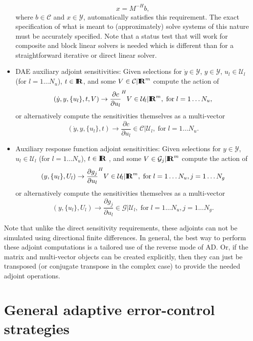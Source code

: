 \documentclass[pdf,ps2pdf,11pt]{SANDreport}
\begin{document}
\begin{itemize}
\[
x = M^{-H} b,
\]
where $b\in\mathcal{C}$ and $x\in\mathcal{Y}$, automatically satisfies this
requirement.  The exact specification of what is meant to (approximately)
solve systems of this nature must be accurately specified. Note that a status
test that will work for composite and block linear solvers is needed which is
different than for a straightforward iterative or direct linear solver.
%
{}\item DAE auxiliary adjoint sensitivities: Given selections for
$\dot{y}\in\mathcal{Y}$, $y\in\mathcal{Y}$, $u_l\in\mathcal{U}_l$ (for
$l=1\ldots{}N_u$), $t\in\mbox{\textbf{I}}\hspace{-0.6ex}\mbox{\textbf{R}}$, and some $V\in\mathcal{C}|\mbox{\textbf{I}}\hspace{-0.6ex}\mbox{\textbf{R}}^m$ compute
the action of
\[
(\dot{y},y,\{u_l\},t,V) {}\rightarrow \frac{\partial c}{\partial u_l}^H V \in \mathcal{U}_l|\mbox{\textbf{I}}\hspace{-0.6ex}\mbox{\textbf{R}}^m,
\; \mbox{for} \; l = 1 {}\ldots N_u,
\]
or alternatively compute the sensitivities themselves as a multi-vector
\[
(\dot{y},y,\{u_l\},t) {}\rightarrow \frac{\partial c}{\partial u_l} \in \mathcal{C}|\mathcal{U}_l,
\; \mbox{for} \; l = 1 {}\ldots N_u.
\]

{}\item Auxiliary response function adjoint sensitivities: Given selections for
$y\in\mathcal{Y}$, $u_l\in\mathcal{U}_l$ (for $l=1\ldots{}N_u$), $t\in\mbox{\textbf{I}}\hspace{-0.6ex}\mbox{\textbf{R}}$ ,
and some $V\in\mathcal{G}_j|\mbox{\textbf{I}}\hspace{-0.6ex}\mbox{\textbf{R}}^m$ compute the action of
\[
(y,\{u_l\},U_l) {}\rightarrow \frac{\partial g_j}{\partial u_l}^H V \in \mathcal{U}_l|\mbox{\textbf{I}}\hspace{-0.6ex}\mbox{\textbf{R}}^m,
\; \mbox{for} \; l = 1 {}\ldots N_u, j = 1 \ldots N_g
\]
or alternatively compute the sensitivities themselves as a multi-vector
\[
(y,\{u_l\},U_l) {}\rightarrow \frac{\partial g_j}{\partial u_l} \in \mathcal{G}|\mathcal{U}_l,
\; \mbox{for} \; l = 1 {}\ldots N_u, j = 1 \ldots N_g.
\]

\end{itemize}

Note that unlike the direct sensitivity requirements, these adjoints can not
be simulated using directional finite differences.  In general, the best way
to perform these adjoint computations is a tailored use of the reverse mode of
AD.  Or, if the matrix and multi-vector objects can be created explicitly,
then they can just be transposed (or conjugate transpose in the complex case)
to provide the needed adjoint operations.

\section{General adaptive error-control strategies}
\end{document}
